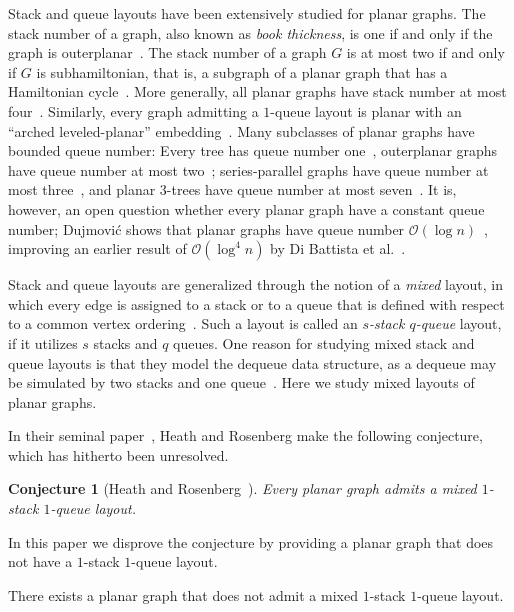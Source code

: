 \documentclass[orivec]{llncs}
\newcommand{\df}[1]{{\it #1}}
\newcommand{\Oh}{{\ensuremath{\mathcal{O}}}}
\newtheorem{conj}{Conjecture}
\newcommand{\wormholeThm}[1]{
    \newcounter{#1}
    \setcounter{#1}{\value{theorem}}}
\begin{document}
Stack and queue layouts have been extensively studied for planar graphs. The stack number of a graph, also known as
\df{book thickness}, is one if and only if the graph is outerplanar~\cite{BK79}.
The stack number of a graph $G$ is at most two if and only if $G$ is subhamiltonian, that is,
a subgraph of a planar graph that has a Hamiltonian cycle~\cite{BK79}. More generally, all planar graphs have stack
number at most four~\cite{Yan89}. Similarly, every graph admitting a $1$-queue layout is planar with an
``arched leveled-planar'' embedding~\cite{HLR92}. Many subclasses of planar graphs have bounded 
queue number: Every tree has queue number one~\cite{HR92}, outerplanar graphs have queue number at most two~\cite{HLR92};
series-parallel graphs have queue number at most three~\cite{RM95}, and planar 3-trees have queue number at most
seven~\cite{Wie17}. It is, however, an open question whether every planar graph have a constant
queue number; Dujmovi{\'c} shows that planar graphs have queue number $\Oh(\log n)$~\cite{Duj15}, improving 
an earlier result of $\Oh(\log^4 n)$ by Di Battista et al.~\cite{BFP13}.

Stack and queue layouts are generalized through the notion of a \df{mixed} layout, in which
every edge is assigned to a stack or to a queue that is defined with respect to a common
vertex ordering~\cite{HR92}. Such a layout is called an \df{$s$-stack $q$-queue} layout, if it utilizes $s$ stacks and $q$
queues. One reason for studying mixed stack and queue layouts is that they model the dequeue data structure, as
a dequeue may be simulated by two stacks and one queue~\cite{DW05,Auer14}.
Here we study mixed layouts of planar graphs.

In their seminal paper~\cite{HR92}, Heath and Rosenberg make the following conjecture, which
has hitherto been unresolved.

\begin{conj}[Heath and Rosenberg~\cite{HR92}]
    \label{conj:HR}
    Every planar graph admits a \break mixed $1$-stack $1$-queue layout.
\end{conj}

In this paper we disprove the conjecture by providing a planar graph that does not have 
a $1$-stack $1$-queue layout.

\wormholeThm{thm-ce}
\begin{theorem}
    \label{thm:ce}
    There exists a planar graph that does not admit a mixed $1$-stack $1$-queue layout.
\end{theorem}
\end{document}
